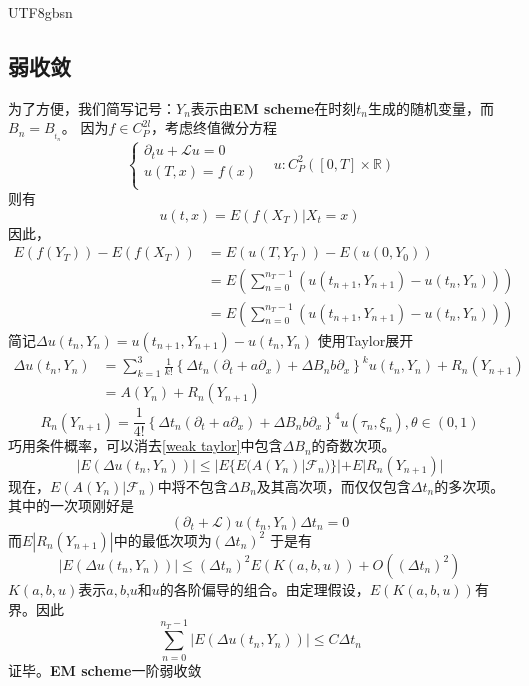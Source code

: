 \documentclass{article}
\begin{document}
\begin{CJK*}{UTF8}{gbsn}
\subsection{弱收敛\label{B2}}
为了方便，我们简写记号：$Y_n$表示由\textbf{EM scheme}在时刻$t_{n}$生成的随机变量，而$B_n=B_{_{t_n}}$。
因为$f\in C_P^{2l}$，考虑终值微分方程
$$
\begin{cases}
        \partial_tu+\mathcal{L}u=0&\\
        u(T,x)=f(x)&\\
    \end{cases}
    u:C^2_P([0,T]\times\mathbb{R}\label{diffeq})
$$
则有
$$
u(t,x)=E(f(X_T)|X_t=x)
$$
因此，$$\begin{aligned}
E(f(Y_{T}))-E(f(X_T))
&=E(u(T,Y_T))-E(u(0,Y_0))\\
&= E \left( \sum_{n=0}^{n_T-1} \left( u(t_{n+1}, Y_{n+1}) - u(t_n, Y_{n}) \right) \right)\\
&= E \left( \sum_{n=0}^{n_T-1} \left( u(t_{n+1}, Y_{n+1}) - u(t_n, Y_{n}) \right) \right)
\end{aligned}$$
简记$\Delta u(t_n,Y_n)= u(t_{n+1}, Y_{n+1}) - u(t_{n}, Y_{n})$
使用Taylor展开
\begin{equation}\begin{aligned}
\Delta u(t_n,Y_n)
&=\sum_{k=1}^3\frac{1}{k!}\left\{\Delta t_n(\partial_t+a\partial_x)+\Delta B_nb\partial_x\right\}^ku(t_n,Y_n)+R_n(Y_{n+1})\\
&=A(Y_n)+R_n(Y_{n+1})
\label{weak taylor}
\end{aligned}\end{equation}
$$
R_n(Y_{n+1})=\frac{1}{4!}\left\{\Delta t_n(\partial_t+a\partial_x)+\Delta B_nb\partial_x\right\}^4u(\tau_n,\xi_n),\theta\in(0,1)
$$
巧用条件概率，可以消去\ref{weak taylor}中包含$\Delta B_n$的奇数次项。
$$
|E(\Delta u(t_n,Y_n))|
\le
|E\{E(A(Y_n)|\mathcal{F}_n)\}|+E|R_n(Y_{n+1})|
$$
现在，$E(A(Y_n)|\mathcal{F}_n)$中将不包含$\Delta B_n$及其高次项，而仅仅包含$\Delta t_n$的多次项。其中的一次项刚好是
$$
(\partial_t+\mathcal{L})u(t_n,Y_n)\Delta t_n=0
$$
而$E|R_n(Y_{n+1})|$中的最低次项为$(\Delta t_n)^2$
于是有
$$
|E(\Delta u(t_n,Y_n))|\le(\Delta t_n)^2E(K(a,b,u))+O((\Delta t_n)^2)
$$
$K(a,b,u)$表示$a,b$,$u$和$u$的各阶偏导的组合。由定理假设，$E(K(a,b,u))$有界。因此
$$
\sum_{n=0}^{n_T-1}|E(\Delta u(t_n,Y_n))|\le C\Delta t_n
$$
证毕。\textbf{EM scheme}一阶弱收敛
\end{CJK*}
\end{document}
